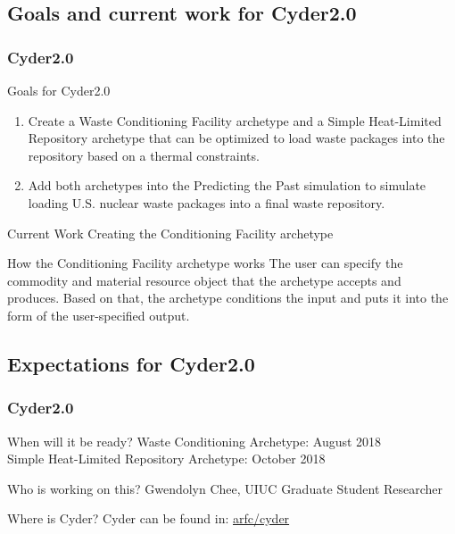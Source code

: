 \subsection{Goals and current work for Cyder2.0}
\begin{frame}
  \frametitle{Cyder2.0}

\begin{block}{Goals for Cyder2.0}
\begin{enumerate}
	\item Create a Waste Conditioning Facility archetype and a Simple Heat-Limited Repository archetype that can be optimized to load waste packages into the repository based on a thermal constraints. 
	\item Add both archetypes into the Predicting the Past \Cyclus simulation to simulate loading U.S. nuclear waste packages into a final waste repository. 
\end{enumerate}
\end{block}

\begin{block}{Current Work}
	Creating the Conditioning Facility archetype
\end{block}

\begin{block}{How the Conditioning Facility archetype works}
The user can specify the commodity and material resource object that the archetype accepts and produces. Based on that, the archetype conditions the input and puts it into the form of the user-specified output.
\end{block}

\end{frame}

\subsection{Expectations for Cyder2.0}

\begin{frame}
\frametitle{Cyder2.0}

\begin{block}{When will it be ready?}
	Waste Conditioning Archetype: August 2018 \\
	Simple Heat-Limited Repository Archetype: October 2018 
\end{block}

\begin{block}{Who is working on this?}
	Gwendolyn Chee, UIUC Graduate Student Researcher
\end{block}

\begin{block}{Where is Cyder?}
	Cyder can be found in: \href{https://github.com/arfc/cyder}{arfc/cyder} 
\end{block}

\end{frame}